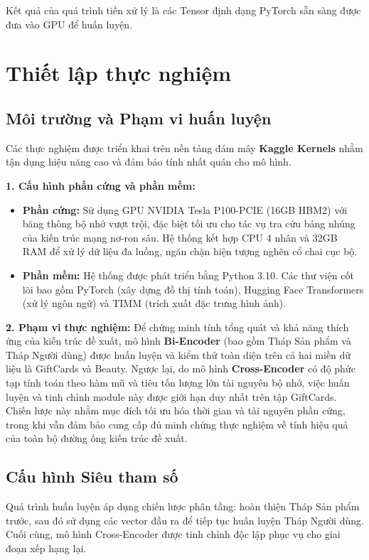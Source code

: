Kết quả của quá trình tiền xử lý là các Tensor định dạng PyTorch sẵn sàng được đưa
vào GPU để huấn luyện.


\section{Thiết lập thực nghiệm}

\subsection{Môi trường và Phạm vi huấn luyện}
Các thực nghiệm được triển khai trên nền tảng đám mây \textbf{Kaggle Kernels} nhằm tận dụng hiệu năng cao và đảm bảo tính nhất quán cho mô hình.

\textbf{1. Cấu hình phần cứng và phần mềm:}
\begin{itemize}
    \item \textbf{Phần cứng:} Sử dụng GPU NVIDIA Tesla P100-PCIE (16GB HBM2) với băng thông bộ nhớ vượt trội, đặc biệt tối ưu cho tác vụ tra cứu bảng nhúng của kiến trúc mạng nơ-ron sâu. Hệ thống kết hợp CPU 4 nhân và 32GB RAM để xử lý dữ liệu đa luồng, ngăn chặn hiện tượng nghẽn cổ chai cục bộ.
    \item \textbf{Phần mềm:} Hệ thống được phát triển bằng Python 3.10. Các thư viện cốt lõi bao gồm PyTorch (xây dựng đồ thị tính toán), Hugging Face Transformers (xử lý ngôn ngữ) và TIMM (trích xuất đặc trưng hình ảnh).
\end{itemize}

\textbf{2. Phạm vi thực nghiệm:}
Để chứng minh tính tổng quát và khả năng thích ứng của kiến trúc đề xuất, mô hình \textbf{Bi-Encoder} (bao gồm Tháp Sản phẩm và Tháp Người dùng) được huấn luyện và kiểm thử toàn diện trên cả hai miền dữ liệu là GiftCards và Beauty. Ngược lại, do mô hình \textbf{Cross-Encoder} có độ phức tạp tính toán theo hàm mũ và tiêu tốn lượng lớn tài nguyên bộ nhớ, việc huấn luyện và tinh chỉnh module này được giới hạn duy nhất trên tập GiftCards. Chiến lược này nhằm mục đích tối ưu hóa thời gian và tài nguyên phần cứng, trong khi vẫn đảm bảo cung cấp đủ minh chứng thực nghiệm về tính hiệu quả của toàn bộ đường ống kiến trúc đề xuất.

\subsection{Cấu hình Siêu tham số}
Quá trình huấn luyện áp dụng chiến lược phân tầng: hoàn thiện Tháp Sản phẩm trước, sau đó sử dụng các vector đầu ra để tiếp tục huấn luyện Tháp Người dùng. Cuối cùng, mô hình Cross-Encoder được tinh chỉnh độc lập phục vụ cho giai đoạn xếp hạng lại.


